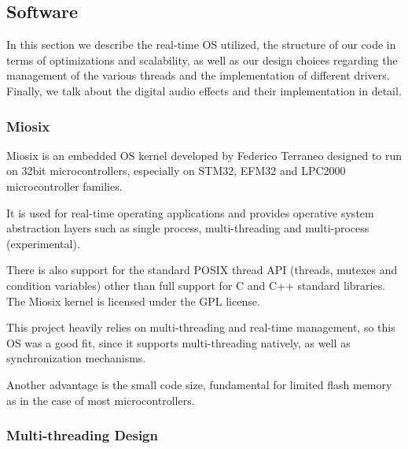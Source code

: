     \vfill

\subsection{Software}
\label{sec:SW}
In this section we describe the real-time OS utilized, the structure of our code in terms of optimizations and scalability, as well as our design choices regarding the management of the various threads and the implementation of different drivers.\\
Finally, we talk about the digital audio effects and their implementation in detail.
    
\subsubsection{Miosix}
\label{sec:Miosix}

Miosix is an embedded OS kernel developed by Federico Terraneo designed to run on 32bit microcontrollers, especially on STM32, EFM32 and LPC2000 microcontroller families. \par

It is used for real-time operating applications and provides operative system abstraction layers such as single process, multi-threading and multi-process (experimental). \par

There is also support for the standard POSIX thread API (threads, mutexes and condition variables) other than full support for C and C++ standard libraries. The Miosix kernel is licensed under the GPL license.


This project heavily relies on multi-threading and real-time management, so this OS was a good fit, since it supports multi-threading natively, as well as synchronization mechanisms.\par

Another advantage is the small code size, fundamental for limited flash memory as in the case of most microcontrollers.


\subsubsection{Multi-threading Design}
\label{sec:Thread}

